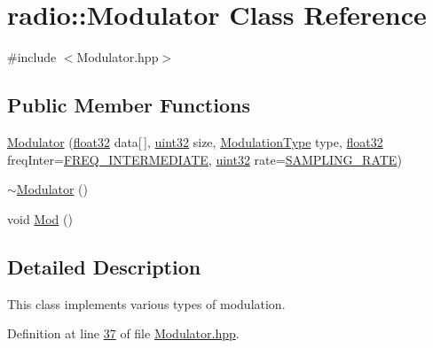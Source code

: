 \hypertarget{classradio_1_1Modulator}{\section{radio\+:\+:Modulator Class Reference}
\label{classradio_1_1Modulator}
}


{\ttfamily \#include $<$Modulator.\+hpp$>$}

\subsection*{Public Member Functions}
\begin{DoxyCompactItemize}
\item 
\hyperlink{classradio_1_1Modulator_ab202651b368986cc76673b6e997550b8}{Modulator} (\hyperlink{definitions_8hpp_aacdc525d6f7bddb3ae95d5c311bd06a1}{float32} data\mbox{[}$\,$\mbox{]}, \hyperlink{definitions_8hpp_a1134b580f8da4de94ca6b1de4d37975e}{uint32} size, \hyperlink{namespaceradio_a46fb7299001138f28b7f69975c58399e}{Modulation\+Type} type, \hyperlink{definitions_8hpp_aacdc525d6f7bddb3ae95d5c311bd06a1}{float32} freq\+Inter=\hyperlink{namespaceradio_aa82ddc6ba206798fd70ffc25665b3cb6}{F\+R\+E\+Q\+\_\+\+I\+N\+T\+E\+R\+M\+E\+D\+I\+A\+T\+E}, \hyperlink{definitions_8hpp_a1134b580f8da4de94ca6b1de4d37975e}{uint32} rate=\hyperlink{namespaceradio_a284213fea4beed2f74bb936927cbe654}{S\+A\+M\+P\+L\+I\+N\+G\+\_\+\+R\+A\+T\+E})
\item 
\hyperlink{classradio_1_1Modulator_a712e6e110c57b29ebdd754bd34bf269b}{$\sim$\+Modulator} ()
\item 
void \hyperlink{classradio_1_1Modulator_ab5eac6e4900579486b5871b48e64cdab}{Mod} ()
\end{DoxyCompactItemize}


\subsection{Detailed Description}
This class implements various types of modulation. 

Definition at line \hyperlink{Modulator_8hpp_source_l00037}{37} of file \hyperlink{Modulator_8hpp_source}{Modulator.\+hpp}.



